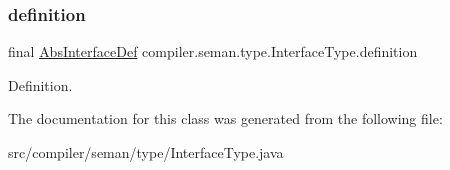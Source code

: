 \subsubsection{\texorpdfstring{definition}{definition}}
{\footnotesize\ttfamily final \hyperlink{classcompiler_1_1abstr_1_1tree_1_1def_1_1_abs_interface_def}{Abs\+Interface\+Def} compiler.\+seman.\+type.\+Interface\+Type.\+definition}

Definition. 

The documentation for this class was generated from the following file\+:\begin{DoxyCompactItemize}
\item 
src/compiler/seman/type/Interface\+Type.\+java\end{DoxyCompactItemize}
